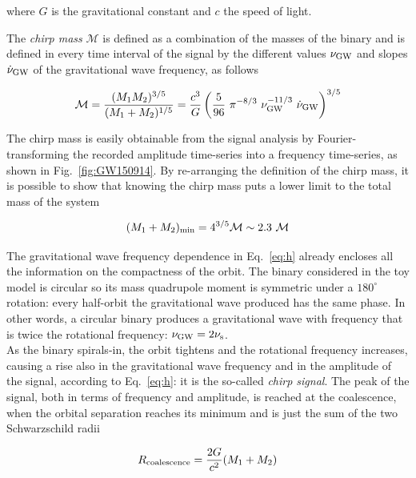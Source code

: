 \documentclass[a4paper,titlepage]{book}     	%
\begin{document}
where $G$ is the gravitational constant and $c$ the speed of light. \cite{MaggioreGW,GWreview} 


The \emph{chirp mass} $\mathcal{M}$ is defined as a combination of the masses of the binary and is defined in every time interval of the signal by the different values $\nu_{\rm GW}$ and slopes $\dot{\nu}_{\rm GW}$ of the gravitational wave frequency, as follows

\begin{equation}\label{eq:Mchirp}
\mathcal{M} = 
\frac{(M_1M_2)^{3/5}}{(M_1+M_2)^{1/5}} =
\frac{c^3}{G} \left(\frac{5}{96}~ \pi^{-8/3}~\nu_{\rm GW}^{-11/3}~ \dot{\nu}_{\rm GW}\right)^{3/5}
\end{equation}

The chirp mass is easily obtainable from the signal analysis by Fourier-transforming the recorded amplitude time-series into a frequency time-series, as shown in Fig.\ \ref{fig:GW150914}. By re-arranging the definition of the chirp mass, it is possible to show that knowing the chirp mass puts a lower limit to the total mass of the system

\begin{equation}
(M_1 + M_2)_{\rm min} = 4^{3/5} \mathcal{M} \sim 2.3~\mathcal{M}
\end{equation}


The gravitational wave frequency dependence in Eq.\ \ref{eq:h} already encloses all the information on the compactness of the orbit. The binary considered in the toy model is circular so its mass quadrupole moment is symmetric under a $180^\circ$ rotation: every half-orbit the gravitational wave produced has the same phase. In other words, a circular binary produces a gravitational wave  with frequency that is twice the rotational frequency:  $\nu_{\rm GW} = 2 \nu_{\rm s}$. \\

As the binary spirals-in, the orbit tightens and the rotational frequency increases, causing a rise also in the gravitational wave frequency and in the amplitude of the signal, according to Eq.\ \ref{eq:h}: it is the so-called \emph{chirp signal}. The peak of the signal, both in terms of frequency and amplitude, is reached at the coalescence, when the orbital separation reaches its minimum and is just the sum of the two Schwarzschild radii

\begin{equation}\label{eq:Rcoalescence}
R_{\rm coalescence} = \frac{2G}{c^2} (M_1 + M_2)
\end{equation}
\end{document}
